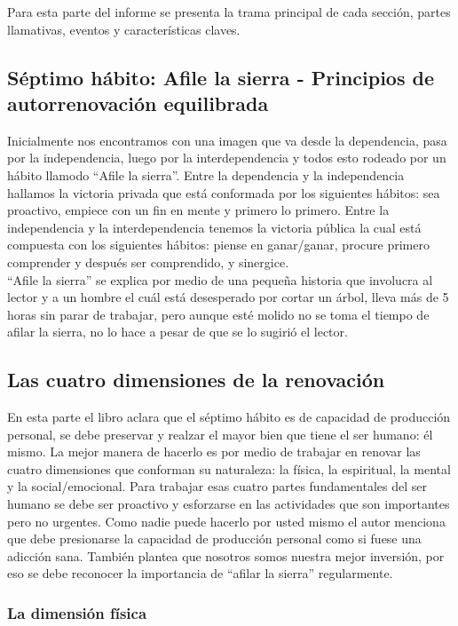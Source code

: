 \documentclass[onecolumn]{article} %
\begin{document}
	Para esta parte del informe se presenta la trama principal de cada sección, partes llamativas, eventos y características claves. 
	
	\subsection{Séptimo hábito: Afile la sierra - Principios de autorrenovación equilibrada}
	
	Inicialmente nos encontramos con una imagen que va desde la dependencia, pasa por la independencia, luego por la interdependencia y todos esto rodeado por un hábito llamodo ``Afile la sierra''. Entre la dependencia y la independencia hallamos la victoria privada que está conformada por los siguientes hábitos: sea proactivo, empiece con un fin en mente y primero lo primero. Entre la independencia y la interdependencia tenemos la victoria pública la cual está compuesta con los siguientes hábitos: piense en ganar/ganar, procure primero comprender y después ser comprendido, y sinergice. \\
	
	``Afile la sierra'' se explica por medio de una pequeña historia que involucra al lector y a un hombre el cuál está desesperado por cortar un árbol, lleva más de 5 horas sin parar de trabajar, pero aunque esté molido no se toma el tiempo de afilar la sierra, no lo hace a pesar de que se lo sugirió el lector. 
	
	\subsection{Las cuatro dimensiones de la renovación}
	
	En esta parte el libro aclara que el séptimo hábito es de capacidad de producción personal, se debe preservar y realzar el mayor bien que tiene el ser humano: él mismo. La mejor manera de hacerlo es por medio de trabajar en renovar las cuatro dimensiones que conforman su naturaleza: la física, la espiritual, la mental y la social/emocional. Para trabajar esas cuatro partes fundamentales del ser humano se debe ser proactivo y esforzarse en las actividades que son importantes pero no urgentes. Como nadie puede hacerlo por usted mismo el autor menciona que debe presionarse la capacidad de producción personal como si fuese una adicción sana. También plantea que nosotros somos nuestra mejor inversión, por eso se debe reconocer la importancia de ``afilar la sierra'' regularmente.
	
	\subsubsection{La dimensión física}
	
\end{document}
